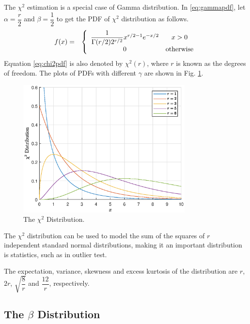 The $\chi^2$ estimation is a special case of Gamma distribution. In \eqref{eq:gammapdf}, let $\alpha = \dfrac{r}{2}$ and $\beta=\dfrac{1}{2}$ to get the PDF of $\chi^2$ distribution as follows.
\begin{eqnarray}
  f(x) &=& \left\{\begin{array}{cc}
                    \dfrac{1}{\Gamma(r/2)2^{r/2}}x^{r/2-1}e^{-x/2} & x > 0  \\
                    0 & \textup{otherwise}
                  \end{array}\right. \label{eq:chi2pdf}
\end{eqnarray}
Equation \eqref{eq:chi2pdf} is also denoted by $\chi^2(r)$, where $r$ is known as the degrees of freedom. The plots of PDFs with different $\gamma$ are shown in Fig. \ref{fig:chi2_pdf}.
\begin{figure}
	\centering
	\includegraphics[width=250pt]{chapters/ch-commonly-seen-distributions/figs/chi2_pdf.eps}
	\caption{The $\chi^2$ Distribution.} \label{fig:chi2_pdf}
\end{figure}

The $\chi^2$ distribution can be used to model the sum of the squares of $r$ independent standard normal distributions, making it an important distribution is statistics, such as in outlier test. 

The expectation, variance, skewness and excess kurtosis of the distribution are $r$, $2r$, $\sqrt{\dfrac{8}{r}}$ and $\dfrac{12}{r}$, respectively.

\subsection{The $\beta$ Distribution}

